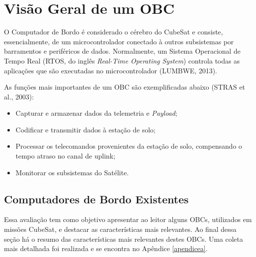 \section{Visão Geral de um OBC}

O Computador de Bordo é considerado o cérebro do CubeSat e consiste, essencialmente, de um microcontrolador conectado à outros subsistemas por barramentos  e periféricos de dados. Normalmente, um Sistema Operacional de Tempo Real (RTOS, do inglês \textit{Real-Time Operating System}) controla todas as aplicações que são executadas no microcontrolador (LUMBWE, 2013).

As funções mais importantes de um OBC são exemplificadas abaixo (STRAS et al., 2003):

\begin{itemize}
	
	\item Capturar e armazenar dados da telemetria e \textit{Payload};
	
	\item Codificar e transmitir dados à estação de solo;
	
	\item Processar os telecomandos provenientes da estação de solo, compensando o tempo atraso no canal de uplink;
	
	\item Monitorar os subsistemas do Satélite.
	
\end{itemize}

\subsection{Computadores de Bordo Existentes}

Essa avaliação tem como objetivo apresentar ao leitor alguns OBCs, utilizados em missões CubeSat, e destacar as características mais relevantes. Ao final dessa seção há o resumo das características mais relevantes destes OBCs. Uma coleta mais detalhada foi realizada e se encontra no Apêndice \ref{apendicea}.

